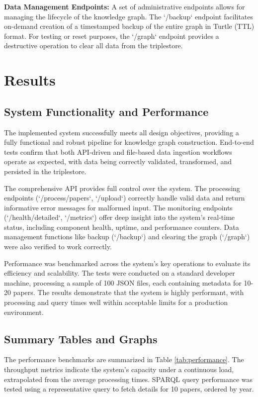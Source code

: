 \documentclass[12pt,a4paper]{article}
\begin{document}
\textbf{Data Management Endpoints:} A set of administrative endpoints allows for managing the lifecycle of the knowledge graph. The `/backup` endpoint facilitates on-demand creation of a timestamped backup of the entire graph in Turtle (TTL) format. For testing or reset purposes, the `/graph` endpoint provides a destructive operation to clear all data from the triplestore.

\section{Results}
\subsection{System Functionality and Performance}
The implemented system successfully meets all design objectives, providing a fully functional and robust pipeline for knowledge graph construction. End-to-end tests confirm that both API-driven and file-based data ingestion workflows operate as expected, with data being correctly validated, transformed, and persisted in the triplestore.

The comprehensive API provides full control over the system. The processing endpoints (`/process/papers`, `/upload`) correctly handle valid data and return informative error messages for malformed input. The monitoring endpoints (`/health/detailed`, `/metrics`) offer deep insight into the system's real-time status, including component health, uptime, and performance counters. Data management functions like backup (`/backup`) and clearing the graph (`/graph`) were also verified to work correctly.

Performance was benchmarked across the system's key operations to evaluate its efficiency and scalability. The tests were conducted on a standard developer machine, processing a sample of 100 JSON files, each containing metadata for 10-20 papers. The results demonstrate that the system is highly performant, with processing and query times well within acceptable limits for a production environment.

\subsection{Summary Tables and Graphs}
The performance benchmarks are summarized in Table \ref{tab:performance}. The throughput metrics indicate the system's capacity under a continuous load, extrapolated from the average processing times. SPARQL query performance was tested using a representative query to fetch details for 10 papers, ordered by year.
\end{document}
